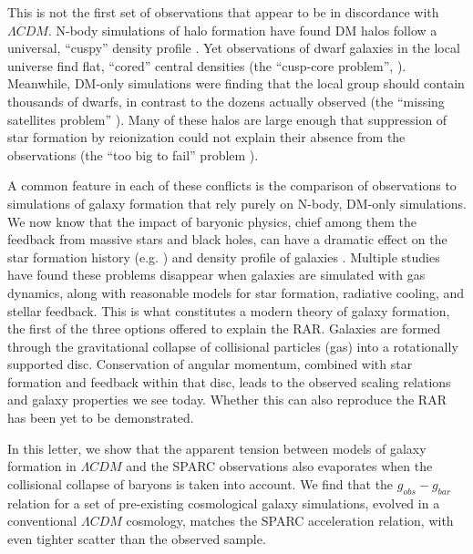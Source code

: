 This is not the first set of observations that appear to be in discordance with
$\Lambda CDM$.  N-body simulations of halo formation have found DM halos follow
a universal, ``cuspy'' density profile \citep{Navarro1996}.  Yet observations of
dwarf galaxies in the local universe find flat, ``cored'' central densities (the
``cusp-core problem'', \citealt{Walker2011}).  Meanwhile, DM-only simulations
were finding that the local group should contain thousands of dwarfs, in
contrast to the dozens actually observed (the ``missing satellites problem''
\citealt{Klypin1999}).  Many of these halos are large enough that suppression of
star formation by reionization could not explain their absence from the
observations (the ``too big to fail'' problem \citealt{Boylan-Kolchin2011}).  

A common feature in each of these conflicts is the comparison of observations to
simulations of galaxy formation that rely purely on N-body, DM-only simulations.
We now know that the impact of baryonic physics, chief among them the feedback
from massive stars and black holes, can have a dramatic effect on the star
formation history (e.g. \citealt{Keller2015}) and density profile of galaxies
\citep{Mashchenko2006}.  Multiple studies \citep[etc]{Pontzen2012,Sawala2016}
have found these problems disappear when galaxies are simulated with gas
dynamics, along with reasonable models for star formation, radiative cooling,
and stellar feedback.  This is what constitutes a modern theory of galaxy
formation, the first of the three options offered to explain the 
RAR.  Galaxies are formed through the gravitational collapse
of collisional particles (gas) into a rotationally supported disc.  Conservation
of angular momentum, combined with star formation and feedback within that disc,
leads to the observed scaling relations and galaxy properties we see today.
Whether this can also reproduce the RAR has been yet to
be demonstrated.

In this letter, we show that the apparent tension between models of galaxy
formation in $\Lambda CDM$ and the SPARC observations also evaporates when the
collisional collapse of baryons is taken into account.  We find that the
$g_{obs}-g_{bar}$ relation for a set of pre-existing cosmological galaxy
simulations, evolved in a conventional $\Lambda CDM$ cosmology, matches the
SPARC acceleration relation, with even tighter scatter than the observed sample.

